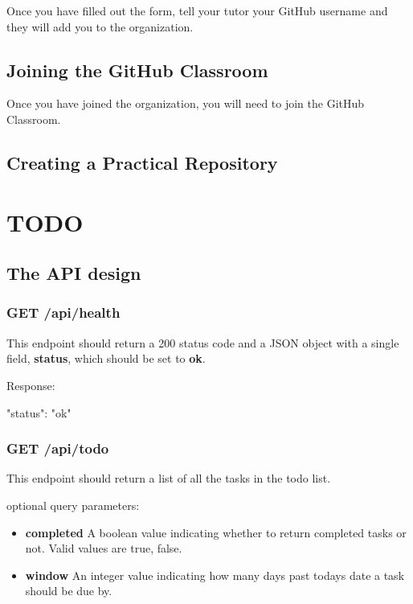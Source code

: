 \documentclass{csse4400}
\begin{document}
Once you have filled out the form,
tell your tutor your GitHub username and they will add you to the organization.

\subsection{Joining the GitHub Classroom}
Once you have joined the organization,
you will need to join the GitHub Classroom.


\subsection{Creating a Practical Repository}

\section{TODO}

\subsection{The API design}

\subsubsection{GET /api/health}
This endpoint should return a 200 status code and a JSON object with a single field, \textbf{status}, which should be set to \textbf{ok}.

Response:
\begin{code}[language=json]{}
{
  "status": "ok"
}
\end{code}

\subsubsection{GET /api/todo}
This endpoint should return a list of all the tasks in the todo list.

optional query parameters:
\begin{itemize}
  \item \textbf{completed} A boolean value indicating whether to return completed tasks or not. Valid values are true, false.
  \item\textbf{window} An integer value indicating how many days past todays date a task should be due by.
\end{itemize}
\end{document}
